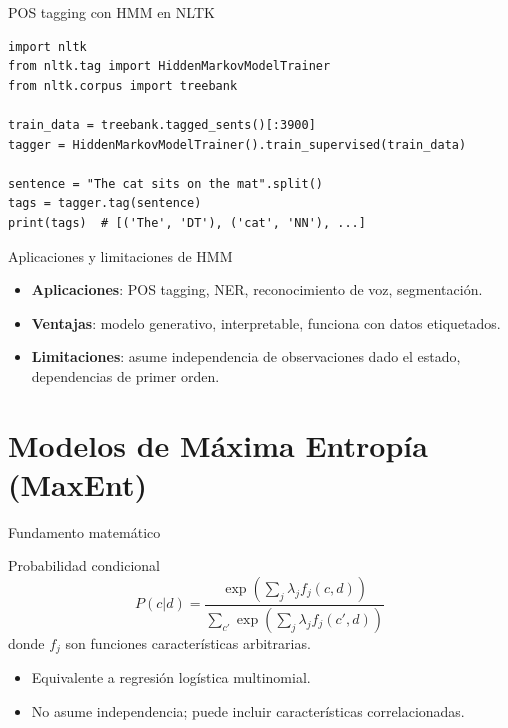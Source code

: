 \documentclass[aspectratio=169, 10pt, xcolor=table]{beamer}
\begin{document}
\begin{frame}[fragile]{POS tagging con HMM en NLTK}
    \begin{lstlisting}
import nltk
from nltk.tag import HiddenMarkovModelTrainer
from nltk.corpus import treebank

train_data = treebank.tagged_sents()[:3900]
tagger = HiddenMarkovModelTrainer().train_supervised(train_data)

sentence = "The cat sits on the mat".split()
tags = tagger.tag(sentence)
print(tags)  # [('The', 'DT'), ('cat', 'NN'), ...]
    \end{lstlisting}
\end{frame}

\begin{frame}{Aplicaciones y limitaciones de HMM}
    \begin{itemize}
        \item \textbf{Aplicaciones}: POS tagging, NER, reconocimiento de voz, segmentación.
        \item \textbf{Ventajas}: modelo generativo, interpretable, funciona con datos etiquetados.
        \item \textbf{Limitaciones}: asume independencia de observaciones dado el estado, dependencias de primer orden.
    \end{itemize}
\end{frame}

\section{Modelos de Máxima Entropía (MaxEnt)}

\begin{frame}{Fundamento matemático}
    \begin{block}{Probabilidad condicional}
        \[
        P(c|d) = \frac{\exp\left(\sum_j \lambda_j f_j(c,d)\right)}{\sum_{c'}\exp\left(\sum_j \lambda_j f_j(c',d)\right)}
        \]
        donde $f_j$ son funciones características arbitrarias.
    \end{block}
    \begin{itemize}
        \item Equivalente a regresión logística multinomial.
        \item No asume independencia; puede incluir características correlacionadas.
    \end{itemize}
\end{frame}
\end{document}
